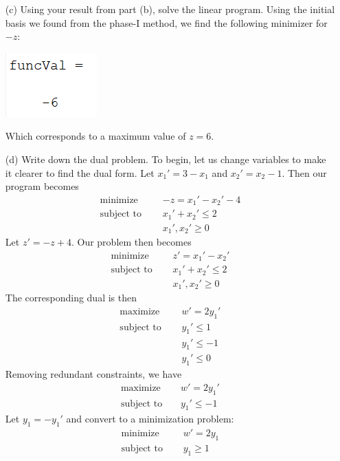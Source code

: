 \documentclass{article}
\begin{document}
\begin{itemize}
\begin{itemize}
        \item[(c)] Using your result from part (b), solve the linear program.
        \newline\newline
        Using the initial basis we found from the phase-I method, we find the following minimizer for $-z$:
        \begin{center}
            \includegraphics{midtermProb5min}
        \end{center}
        Which corresponds to a maximum value of $z = 6$.
        \newline\newline

        \item[(d)] Write down the dual problem.
        \newline\newline
        To begin, let us change variables to make it clearer to find the dual form. Let $x_1' = 3 - x_1$ and $x_2' = x_2 - 1$. Then our program becomes
        \begin{align*}
            \text{minimize} \:\:\:\:\:\:\:\: &-z = x_1' - x_2' - 4\\
            \text{subject to}\:\:\:\:\:\: &x_1' + x_2' \leq 2\\
            &x_1',x_2' \geq 0
        \end{align*}
        Let $z' = -z + 4$. Our problem then becomes
        \begin{align*}
            \text{minimize} \:\:\:\:\:\:\: &z' = x_1' - x_2'\\
            \text{subject to} \:\:\:\:\:\: &x_1' + x_2' \leq 2\\
            &x_1',x_2' \geq 0
        \end{align*}
        The corresponding dual is then
        \begin{align*}
            \text{maximize} \:\:\:\:\:\: &w' = 2y_1'\\
            \text{subject to} \:\:\:\:\:\: &y_1' \leq 1\\
            &y_1' \leq -1\\
            &y_1' \leq 0
        \end{align*}
        Removing redundant constraints, we have
        \begin{align*}
            \text{maximize} \:\:\:\:\: &w' = 2y_1'\\
            \text{subject to} \:\:\:\:\: &y_1' \leq -1
        \end{align*}
        Let $y_1 = -y_1'$ and convert to a minimization problem:
        \begin{align*}
            \text{minimize} \:\:\:\:\:\:\: &w' = 2y_1\\
            \text{subject to} \:\:\:\:\:\: &y_1 \geq 1
        \end{align*}
        


\end{itemize}
\end{itemize}
\end{document}
